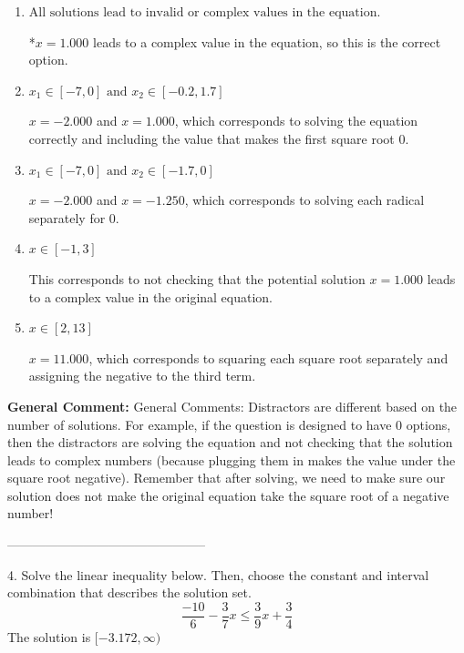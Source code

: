\documentclass{extbook}[14pt]
\begin{document}
\begin{enumerate}[label=\Alph*.] 
\item $ \text{All solutions lead to invalid or complex values in the equation.} $ 

 *$x = 1.000$ leads to a complex value in the equation, so this is the correct option. 
\item $ x_1 \in [-7, 0] \text{ and } x_2 \in [-0.2,1.7] $ 

 $x = -2.000$ and $x = 1.000$, which corresponds to solving the equation correctly and including the value that makes the first square root 0. 
\item $ x_1 \in [-7, 0] \text{ and } x_2 \in [-1.7,0] $ 

 $x = -2.000$ and $x = -1.250$, which corresponds to solving each radical separately for 0. 
\item $ x \in [-1,3] $ 

 This corresponds to not checking that the potential solution $x = 1.000$ leads to a complex value in the original equation. 
\item $ x \in [2,13] $ 

 $x = 11.000$, which corresponds to squaring each square root separately and assigning the negative to the third term. 
\end{enumerate} 
 
\textbf{General Comment:} General Comments: Distractors are different based on the number of solutions. For example, if the question is designed to have 0 options, then the distractors are solving the equation and not checking that the solution leads to complex numbers (because plugging them in makes the value under the square root negative). Remember that after solving, we need to make sure our solution does not make the original equation take the square root of a negative number! 

-----------------------------------------------

4. Solve the linear inequality below. Then, choose the constant and interval combination that describes the solution set.
\[ \frac{-10}{6} - \frac{3}{7} x \leq \frac{3}{9} x + \frac{3}{4} \] 
The solution is $ [-3.172, \infty) $ 
\end{document}

